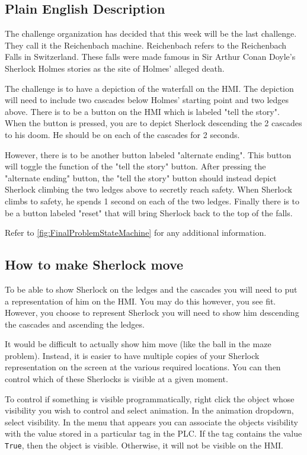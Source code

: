 \subsection{Plain English Description}

The challenge organization has decided that this week will be the last challenge. They call it the Reichenbach machine. Reichenbach refers to the Reichenbach Falls in Switzerland. These falls were made famous in Sir Arthur Conan Doyle's Sherlock Holmes stories as the site of Holmes' alleged death.

The challenge is to have a depiction of the waterfall on the HMI. The depiction will need to include two cascades below Holmes' starting point and two ledges above. There is to be a button on the HMI which is labeled "tell the story". When the button is pressed, you are to depict Sherlock descending the 2 cascades to his doom. He should be on each of the cascades for 2 seconds.

However, there is to be another button labeled "alternate ending". This button will toggle the function of the "tell the story" button. After pressing the "alternate ending" button, the "tell the story" button should instead depict Sherlock climbing the two ledges above to secretly reach safety. When Sherlock climbs to safety, he spends 1 second on each of the two ledges. Finally there is to be a button labeled "reset" that will bring Sherlock back to the top of the falls.

Refer to \figureautorefname \ref{fig:FinalProblemStateMachine} for any additional information.

\subsection{How to make Sherlock move}

To be able to show Sherlock on the ledges and the cascades you will need to put a representation of him on the HMI. You may do this however, you see fit. However, you choose to represent Sherlock you will need to show him descending the cascades and ascending the ledges. 

It would be difficult to actually show him move (like the ball in the maze problem). Instead, it is easier to have multiple copies of your Sherlock representation on the screen at the various required locations. You can then control which of these Sherlocks is visible at a given moment. 

To control if something is visible programmatically, right click the object whose visibility you wish to control and select animation. In the animation dropdown, select visibility. In the menu that appears you can associate the objects visibility with the value stored in a particular tag in the PLC. If the tag contains the value \verb|True|, then the object is visible. Otherwise, it will not be visible on the HMI.

\TASignatureSlot